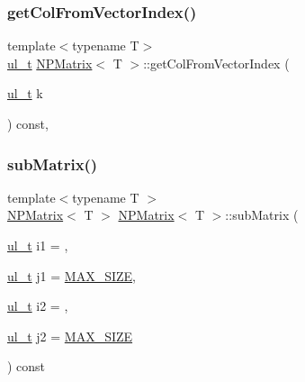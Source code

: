 \mbox{\label{class_n_p_matrix_a3ef7e9e257ba6119e369a9a3c633d35d}} 
\subsubsection{\texorpdfstring{getColFromVectorIndex()}{getColFromVectorIndex()}}
{\footnotesize\ttfamily template$<$typename T$>$ \\
\mbox{\hyperlink{typedef_8h_a1b140a2034db3f5dfe18a987745df43a}{ul\+\_\+t}} \mbox{\hyperlink{class_n_p_matrix}{N\+P\+Matrix}}$<$ T $>$\+::get\+Col\+From\+Vector\+Index (\begin{DoxyParamCaption}\item[{\mbox{\hyperlink{typedef_8h_a1b140a2034db3f5dfe18a987745df43a}{ul\+\_\+t}}}]{k }\end{DoxyParamCaption}) const\hspace{0.3cm}{\ttfamily [inline]}, {\ttfamily [protected]}}

\mbox{\label{class_n_p_matrix_a1af1b395e03d5009666214eb7f954afb}} 
\subsubsection{\texorpdfstring{subMatrix()}{subMatrix()}}
{\footnotesize\ttfamily template$<$typename T $>$ \\
\mbox{\hyperlink{class_n_p_matrix}{N\+P\+Matrix}}$<$ T $>$ \mbox{\hyperlink{class_n_p_matrix}{N\+P\+Matrix}}$<$ T $>$\+::sub\+Matrix (\begin{DoxyParamCaption}\item[{\mbox{\hyperlink{typedef_8h_a1b140a2034db3f5dfe18a987745df43a}{ul\+\_\+t}}}]{i1 = {},  }\item[{\mbox{\hyperlink{typedef_8h_a1b140a2034db3f5dfe18a987745df43a}{ul\+\_\+t}}}]{j1 = {\ttfamily \mbox{\hyperlink{_n_vector_8h_a0592dba56693fad79136250c11e5a7fe}{M\+A\+X\+\_\+\+S\+I\+ZE}}},  }\item[{\mbox{\hyperlink{typedef_8h_a1b140a2034db3f5dfe18a987745df43a}{ul\+\_\+t}}}]{i2 = {},  }\item[{\mbox{\hyperlink{typedef_8h_a1b140a2034db3f5dfe18a987745df43a}{ul\+\_\+t}}}]{j2 = {\ttfamily \mbox{\hyperlink{_n_vector_8h_a0592dba56693fad79136250c11e5a7fe}{M\+A\+X\+\_\+\+S\+I\+ZE}}} }\end{DoxyParamCaption}) const\hspace{0.3cm}{\ttfamily [protected]}}


